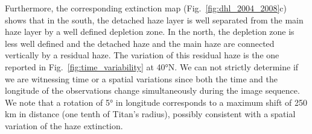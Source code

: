 Furthermore, the corresponding extinction map (Fig.~\ref{fig:dhl_2004_2008}c) shows that in the south,
the detached haze layer is well separated from the main haze layer by a well defined depletion zone. In the north, the depletion
zone is less well defined and the detached haze and the main haze are connected vertically by a residual haze.
The variation of this residual haze is the one reported in Fig.~\ref{fig:time_variability} at \ang{40}N.
We can not strictly determine if we are witnessing time or a spatial variations since both the time and the longitude
of the observations change simultaneously during the image sequence. We note that a rotation of \ang{5} in longitude
corresponds to a maximum shift of 250 km in distance (one tenth of Titan's radius), possibly consistent with a spatial
variation of the haze extinction.
